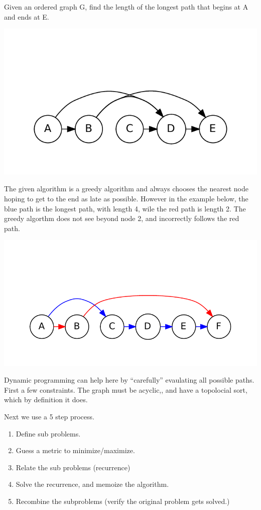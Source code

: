 \documentclass[12pt]{article}
\newenvironment{problem}[2][Problem]{\begin{trivlist}
\item[\hskip \labelsep {\bfseries #1}\hskip \labelsep {\bfseries #2.}]}{\end{trivlist}}
\begin{document}
\begin{problem}{6.3}
    Given an ordered graph G, find the length of the longest path that begins at A and ends at E.
    
    \includegraphics{6_3a.pdf}

    The given algorithm is a greedy algorithm and always chooses the nearest
    node hoping to get to the end as late as possible. However in the example
    below, the blue path is the longest path, with length 4, wile the red path
    is length 2. The greedy algorthm does not see beyond node 2, and incorrectly
    follows the red path.

    \includegraphics{6_3b.pdf}
    
    Dynamic programming can help here by ``carefully'' evaulating all possible
    paths. First a few constraints. The graph must be acyclic,, and have
    a topolocial sort, which by definition it does. 

    Next we use a 5 step process. 
    \begin{enumerate}
        \item Define sub problems.
        \item Guess a metric to minimize/maximize.
        \item Relate the sub problems (recurrence)
        \item Solve the recurrence, and memoize the algorithm.
        \item Recombine the subproblems (verify the original problem gets
            solved.)
    \end{enumerate}
     

\end{problem}
\end{document}
